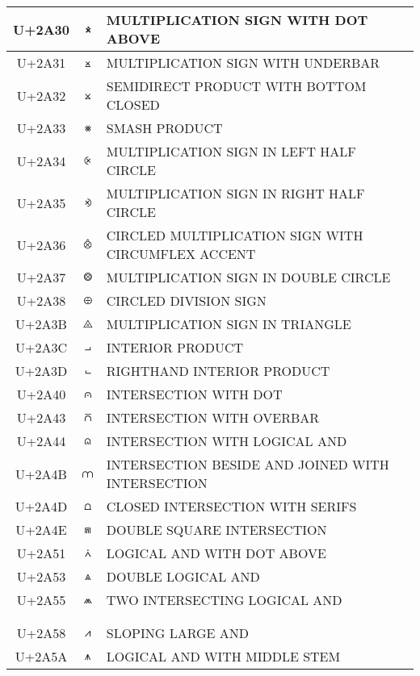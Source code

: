 \documentclass[a4paper]{article}
\begin{document}
\begin{longtable}{ccl}
  U+2A30 & \texttt{⨰}  & MULTIPLICATION SIGN WITH DOT ABOVE \\ \hline
  U+2A31 & \texttt{⨱}  & MULTIPLICATION SIGN WITH UNDERBAR \\ \hline
  U+2A32 & \texttt{⨲}  & SEMIDIRECT PRODUCT WITH BOTTOM CLOSED \\ \hline
  U+2A33 & \texttt{⨳}  & SMASH PRODUCT \\ \hline
  U+2A34 & \texttt{⨴}  & MULTIPLICATION SIGN IN LEFT HALF CIRCLE \\ \hline
  U+2A35 & \texttt{⨵}  & MULTIPLICATION SIGN IN RIGHT HALF CIRCLE \\ \hline
  U+2A36 & \texttt{⨶}  & CIRCLED MULTIPLICATION SIGN WITH CIRCUMFLEX ACCENT \\ \hline
  U+2A37 & \texttt{⨷}  & MULTIPLICATION SIGN IN DOUBLE CIRCLE \\ \hline
  U+2A38 & \texttt{⨸}  & CIRCLED DIVISION SIGN \\ \hline
  U+2A3B & \texttt{⨻}  & MULTIPLICATION SIGN IN TRIANGLE \\ \hline
  U+2A3C & \texttt{⨼}  & INTERIOR PRODUCT \\ \hline
  U+2A3D & \texttt{⨽}  & RIGHTHAND INTERIOR PRODUCT \\ \hline
  U+2A40 & \texttt{⩀}  & INTERSECTION WITH DOT \\ \hline
  U+2A43 & \texttt{⩃}  & INTERSECTION WITH OVERBAR \\ \hline
  U+2A44 & \texttt{⩄}  & INTERSECTION WITH LOGICAL AND \\ \hline
  U+2A4B & \texttt{⩋}  & INTERSECTION BESIDE AND JOINED WITH INTERSECTION \\ \hline
  U+2A4D & \texttt{⩍}  & CLOSED INTERSECTION WITH SERIFS \\ \hline
  U+2A4E & \texttt{⩎}  & DOUBLE SQUARE INTERSECTION \\ \hline
  U+2A51 & \texttt{⩑}  & LOGICAL AND WITH DOT ABOVE \\ \hline
  U+2A53 & \texttt{⩓}  & DOUBLE LOGICAL AND \\ \hline
  U+2A55 & \texttt{⩕}  & TWO INTERSECTING LOGICAL AND \\ \hline
 \\ \hline
 \\ \hline
  U+2A58 & \texttt{⩘}  & SLOPING LARGE AND \\ \hline
  U+2A5A & \texttt{⩚}  & LOGICAL AND WITH MIDDLE STEM \\ \hline

\end{longtable}
\end{document}
